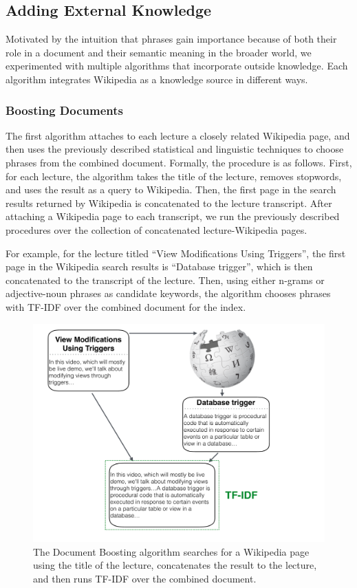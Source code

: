 \subsection{Adding External Knowledge}
\label{sec:wiki}


Motivated by the intuition that phrases gain importance because of both their role in a document and their semantic meaning in the broader world, we experimented with multiple algorithms that incorporate outside knowledge. Each algorithm integrates Wikipedia as a knowledge source in different ways.

\subsubsection{Boosting Documents}

The first algorithm attaches to each lecture a closely related Wikipedia page, and then uses the previously described statistical and linguistic techniques to choose phrases from the combined document. Formally, the procedure is as follows. First, for each lecture, the algorithm takes the title of the lecture, removes stopwords, and uses the result as a query to Wikipedia. Then, the first page in the search results returned by Wikipedia is concatenated to the lecture transcript. After attaching a Wikipedia page to each transcript, we run the previously described procedures over the collection of concatenated lecture-Wikipedia pages.

For example, for the lecture titled ``View Modifications Using
Triggers'', the first page in the Wikipedia search results is
``Database trigger'', which is then concatenated to the transcript of
the lecture. Then, using either n-grams or adjective-noun phrases as
candidate keywords, the algorithm chooses phrases with TF-IDF over the
combined document for the index.

\begin{figure}
\caption{The Document Boosting algorithm searches for a Wikipedia page using the title of the lecture, concatenates the result to the lecture, and then runs TF-IDF over the combined document.}
\includegraphics[width=\textwidth]{document_boosting.pdf}
\end{figure}

